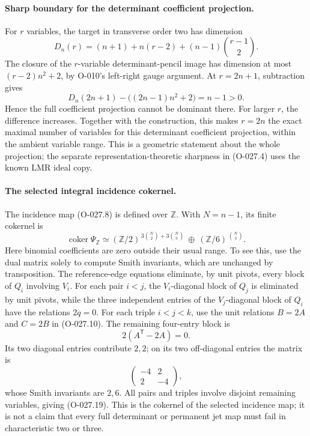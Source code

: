 \paragraph{Sharp boundary for the determinant coefficient projection.}
For \(r\) variables, the target in transverse order two has dimension
\[
 D_n(r)=(n+1)+n(r-2)+(n-1)\binom{r-1}{2}.
                                                               \tag{O-027.17}
\]
The closure of the \(r\)-variable determinant-pencil image
has dimension at most \((r-2)n^2+2\), by O-010's
left-right gauge argument. At \(r=2n+1\), subtraction gives
\[
             D_n(2n+1)-\bigl((2n-1)n^2+2\bigr)=n-1>0.
                                                               \tag{O-027.18}
\]
Hence the full coefficient projection cannot be dominant
there. For larger \(r\), the difference increases.
Together with the construction, this makes \(r=2n\) the
exact maximal number of variables for this determinant
coefficient projection, within the ambient variable range.
This is a geometric statement about the whole projection;
the separate representation-theoretic sharpness in
(O-027.4) uses the known LMR ideal copy.

\paragraph{The selected integral incidence cokernel.}
The incidence map (O-027.8) is defined over \(\mathbb Z\).
With \(N=n-1\), its finite cokernel is
\[
 \operatorname{coker}\Psi_{\mathbb Z}
 \simeq
 (\mathbb Z/2)^{\,3\binom N2+3\binom N3}
       \ \oplus\
 (\mathbb Z/6)^{\,\binom N3}.
                                                               \tag{O-027.19}
\]
Here binomial coefficients are zero outside their usual range.
To see this, use the dual matrix solely to compute Smith
invariants, which are unchanged by transposition.
The reference-edge equations eliminate, by unit pivots,
every block of \(Q_i\) involving \(V_i\).
For each pair \(i<j\), the \(V_i\)-diagonal block of \(Q_j\)
is eliminated by unit pivots, while the three independent
entries of the \(V_j\)-diagonal block of \(Q_i\) have the
relations \(2q=0\).
For each triple \(i<j<k\), use the unit relations
\(B=2A\) and \(C=2B\) in (O-027.10).
The remaining four-entry block is
\[
                          2(A^{\mathsf T}-2A)=0.
\]
Its two diagonal entries contribute \(2,2\); on its two
off-diagonal entries the matrix is
\[
                    \begin{pmatrix}-4&2\\2&-4\end{pmatrix},
\]
whose Smith invariants are \(2,6\).
All pairs and triples involve disjoint remaining variables,
giving (O-027.19).
This is the cokernel of the selected incidence map;
it is not a claim that every full determinant or permanent
jet map must fail in characteristic two or three.

